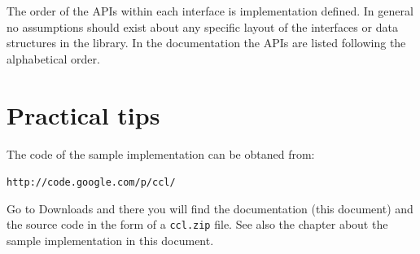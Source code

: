 The order of the APIs within each interface is implementation defined. In general no assumptions should 
exist about any specific layout of the interfaces or data structures in the library. In the documentation
the APIs are listed following the alphabetical order.

\section{Practical tips}
The code of the sample implementation can be obtaned from:

\noindent\verb,http://code.google.com/p/ccl/,

Go to Downloads and there you will find the documentation (this document) and the source code in the form of a \verb,ccl.zip, file.
 See also the chapter about the sample implementation in this document.
